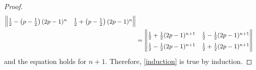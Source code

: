 \begin{proof}
\begin{align*}
\begin{Vmatrix}
      \frac{1}{2} - \left(p - \frac{1}{2}\right)(2p - 1)^n & \frac{1}{2} + \left(p - \frac{1}{2}\right)(2p - 1)^n \\
    \end{Vmatrix} \\
    &=
    \renewcommand\arraystretch{1.5}
    \begin{Vmatrix}
      \frac{1}{2} + \frac{1}{2}(2p - 1)^{n+1} & \frac{1}{2} - \frac{1}{2}(2p - 1)^{n+1}  \\
      \frac{1}{2} - \frac{1}{2}(2p - 1)^{n+1} & \frac{1}{2} + \frac{1}{2}(2p - 1)^{n+1} \\
    \end{Vmatrix}
  \end{align*}
  and the equation holds for $n+1$. Therefore, \eqref{induction} is true by induction.
\end{proof}
\newpage
